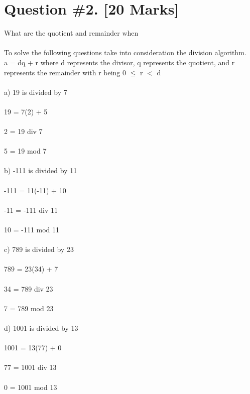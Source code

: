\documentclass{article}
\begin{document}
\section{Question \#2. [20 Marks]}
What are the quotient and remainder when \\\\
To solve the following questions take into consideration the division algorithm. \\ 
a = dq + r where d represents the divisor, q represents the quotient, and r represents the remainder with r being 0 $\leq$ r $<$ d \\\\
a) 19 is divided by 7 \\\\
19 = 7(2) + 5 \\\\
2  = 19 div 7 \\ \\
5 = 19 mod 7 \\ \\ 
b) -111 is divided by 11 \\\\
-111 = 11(-11) + 10 \\\\
-11 = -111 div 11 \\ \\
10  = -111 mod 11  \\\\
c) 789 is divided by 23 \\\\
789 = 23(34) + 7 \\\\
34 = 789 div 23 \\ \\
7 = 789 mod 23  \\\\
d) 1001 is divided by 13 \\\\
1001 = 13(77) + 0 \\\\
77 = 1001 div 13 \\ \\
0  = 1001 mod 13  \\\\
\newpage
\end{document}
